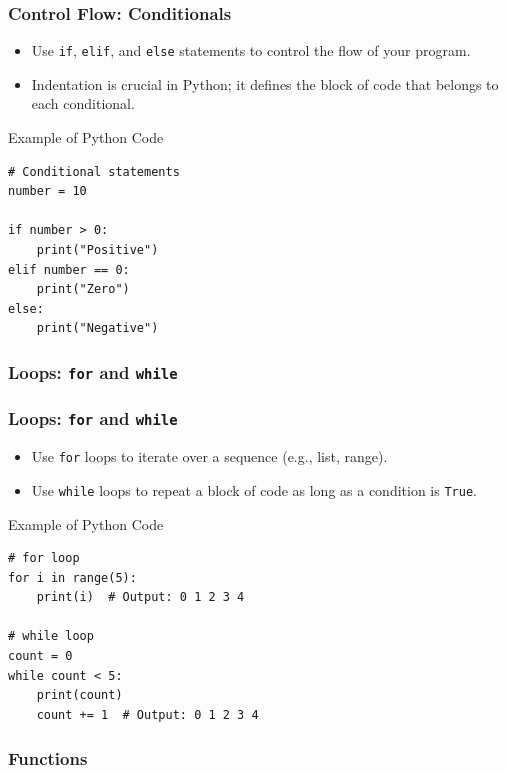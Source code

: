 \documentclass{beamer}
\begin{document}
\begin{frame}[fragile]
\frametitle{Control Flow: Conditionals}
\begin{itemize}
    \item Use \texttt{if}, \texttt{elif}, and \texttt{else} statements to control the flow of your program.
    \item Indentation is crucial in Python; it defines the block of code that belongs to each conditional.
\end{itemize}
\tiny{
\begin{block}{Example of Python Code}
\begin{verbatim}
# Conditional statements
number = 10

if number > 0:
    print("Positive")
elif number == 0:
    print("Zero")
else:
    print("Negative")
\end{verbatim}
\end{block}}
\end{frame}

\subsubsection*{Loops: \texttt{for} and \texttt{while}}

\begin{frame}[fragile]
\frametitle{Loops: \texttt{for} and \texttt{while}}
\begin{itemize}
    \item Use \texttt{for} loops to iterate over a sequence (e.g., list, range).
    \item Use \texttt{while} loops to repeat a block of code as long as a condition is \texttt{True}.
\end{itemize}
\tiny{
\begin{block}{Example of Python Code}
\begin{verbatim}
# for loop
for i in range(5):
    print(i)  # Output: 0 1 2 3 4

# while loop
count = 0
while count < 5:
    print(count)
    count += 1  # Output: 0 1 2 3 4
\end{verbatim}
\end{block}}
\end{frame}

\subsubsection*{Functions}
\end{document}
